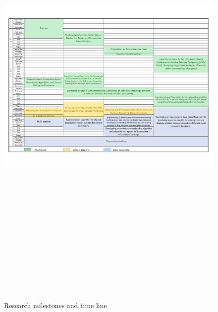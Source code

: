     \begin{figure}
                \begin{center}
                \includegraphics[width=16cm, height=22cm]{timeline/timetable.pdf}\label{Timetable}
                \caption{Research milestones and time line}
                \end{center}
    \end{figure}   